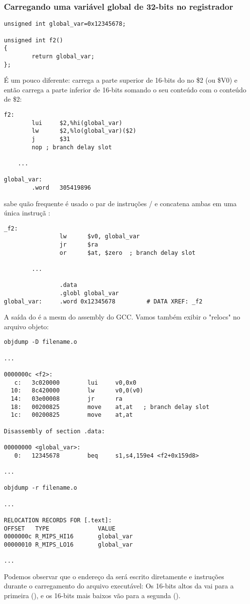 \subsubsection{Carregando uma variável global de 32-bits no registrador}

\begin{lstlisting}[style=customc]
unsigned int global_var=0x12345678;

unsigned int f2()
{
        return global_var;
};
\end{lstlisting}


É um pouco diferente:  carrega a parte superior de 16-bits do  no \$2 (ou \$V0) e então  carrega a parte inferior de 16-bits somando o seu conteúdo com o conteúdo de \$2:

\begin{lstlisting}[caption=GCC 4.4.5 -O3 (\assemblyOutput),style=customasmMIPS]
f2:
        lui     $2,%hi(global_var)
        lw      $2,%lo(global_var)($2)
        j       $31
        nop	; branch delay slot

	...

global_var:
        .word   305419896
\end{lstlisting}

\IDA sabe quão frequente é usado o par de instruções / e concatena ambas em uma única instruçã :

\begin{lstlisting}[caption=GCC 4.4.5 -O3 (IDA),style=customasmMIPS]
_f2:
                lw      $v0, global_var
                jr      $ra
                or      $at, $zero	; branch delay slot

		...

                .data
                .globl global_var
global_var:     .word 0x12345678         # DATA XREF: _f2
\end{lstlisting}

A saída do  é a mesm do assembly do GCC.
Vamos também exibir o "relocs" no arquivo objeto:

\begin{lstlisting}[caption=objdump,style=customasmMIPS]
objdump -D filename.o

...

0000000c <f2>:
   c:   3c020000        lui     v0,0x0
  10:   8c420000        lw      v0,0(v0)
  14:   03e00008        jr      ra
  18:   00200825        move    at,at	; branch delay slot
  1c:   00200825        move    at,at

Disassembly of section .data:

00000000 <global_var>:
   0:   12345678        beq     s1,s4,159e4 <f2+0x159d8>

...

objdump -r filename.o

...

RELOCATION RECORDS FOR [.text]:
OFFSET   TYPE              VALUE
0000000c R_MIPS_HI16       global_var
00000010 R_MIPS_LO16       global_var

...

\end{lstlisting}

Podemos observar que o endereço da  será escrito diretamente  e instruções  durante o carregamento do arquivo executável:
Os 16-bits altos da  vai para a primeira (), e os 16-bits mais baixos vão para a segunda ().